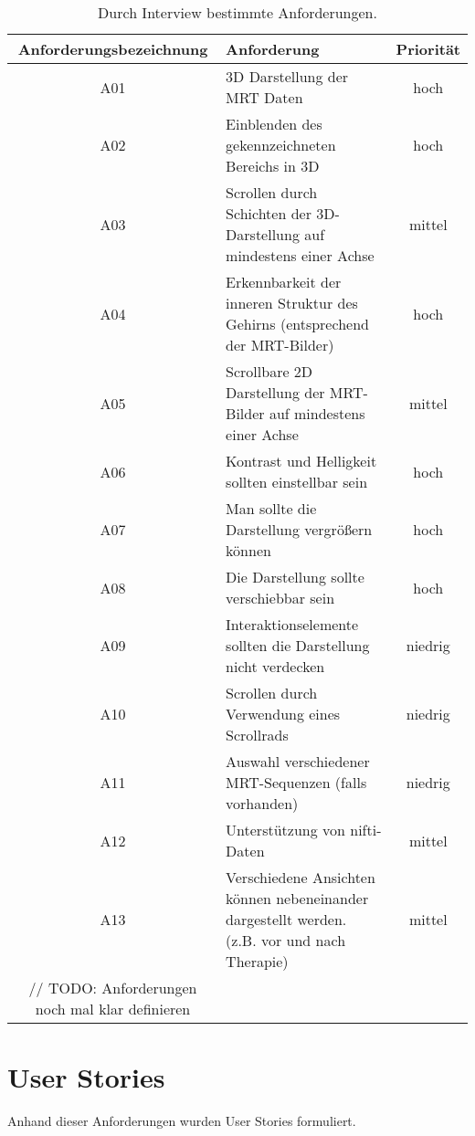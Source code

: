 \begin{table}
\begin{tabular}{|c|p{10cm}|c|}
\hline
Anforderungsbezeichnung & Anforderung & Priorität \\
\hline
A01 & 3D Darstellung der MRT Daten & hoch\\
\hline
A02 & Einblenden des gekennzeichneten Bereichs in 3D & hoch\\
\hline
A03 & Scrollen durch Schichten der 3D-Darstellung auf mindestens einer Achse& mittel\\
\hline
A04 & Erkennbarkeit der inneren Struktur des Gehirns (entsprechend der MRT-Bilder) & hoch\\
\hline
A05 & Scrollbare 2D Darstellung der MRT-Bilder auf mindestens einer Achse & mittel\\
\hline
A06 & Kontrast und Helligkeit sollten einstellbar sein & hoch\\
\hline
A07 & Man sollte die Darstellung vergrößern können & hoch\\
\hline
A08 & Die Darstellung sollte verschiebbar sein & hoch\\
\hline
A09 & Interaktionselemente sollten die Darstellung nicht verdecken & niedrig\\
\hline
A10 & Scrollen durch Verwendung eines Scrollrads & niedrig\\
\hline
A11 & Auswahl verschiedener MRT-Sequenzen (falls vorhanden) & niedrig\\
\hline
A12 & Unterstützung von nifti-Daten & mittel\\
\hline
A13 & Verschiedene Ansichten können nebeneinander dargestellt werden. (z.B. vor und nach Therapie) & mittel\\
\hline

// TODO:
Anforderungen noch mal klar definieren

\end{tabular}
\caption{\label{tab:table-name} Durch Interview bestimmte Anforderungen.}
\end{table}

\section{User Stories}

Anhand dieser Anforderungen wurden User Stories formuliert. 

